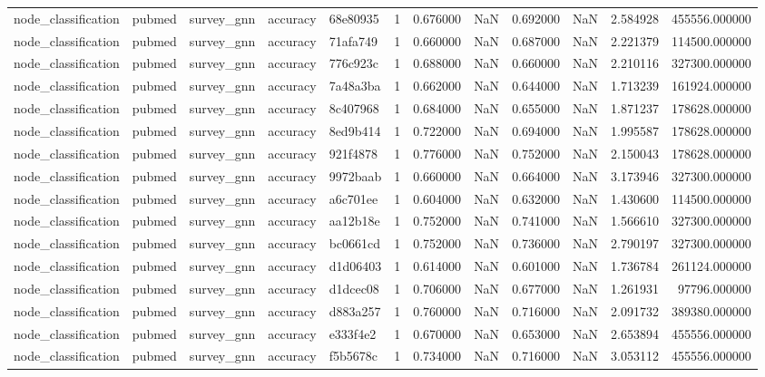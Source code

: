 \begin{tabular}{lllllrrrrrrr}
node_classification & pubmed & survey_gnn & accuracy & 68e80935 & 1 & 0.676000 & NaN & 0.692000 & NaN & 2.584928 & 455556.000000 \\
node_classification & pubmed & survey_gnn & accuracy & 71afa749 & 1 & 0.660000 & NaN & 0.687000 & NaN & 2.221379 & 114500.000000 \\
node_classification & pubmed & survey_gnn & accuracy & 776c923c & 1 & 0.688000 & NaN & 0.660000 & NaN & 2.210116 & 327300.000000 \\
node_classification & pubmed & survey_gnn & accuracy & 7a48a3ba & 1 & 0.662000 & NaN & 0.644000 & NaN & 1.713239 & 161924.000000 \\
node_classification & pubmed & survey_gnn & accuracy & 8c407968 & 1 & 0.684000 & NaN & 0.655000 & NaN & 1.871237 & 178628.000000 \\
node_classification & pubmed & survey_gnn & accuracy & 8ed9b414 & 1 & 0.722000 & NaN & 0.694000 & NaN & 1.995587 & 178628.000000 \\
node_classification & pubmed & survey_gnn & accuracy & 921f4878 & 1 & 0.776000 & NaN & 0.752000 & NaN & 2.150043 & 178628.000000 \\
node_classification & pubmed & survey_gnn & accuracy & 9972baab & 1 & 0.660000 & NaN & 0.664000 & NaN & 3.173946 & 327300.000000 \\
node_classification & pubmed & survey_gnn & accuracy & a6c701ee & 1 & 0.604000 & NaN & 0.632000 & NaN & 1.430600 & 114500.000000 \\
node_classification & pubmed & survey_gnn & accuracy & aa12b18e & 1 & 0.752000 & NaN & 0.741000 & NaN & 1.566610 & 327300.000000 \\
node_classification & pubmed & survey_gnn & accuracy & bc0661cd & 1 & 0.752000 & NaN & 0.736000 & NaN & 2.790197 & 327300.000000 \\
node_classification & pubmed & survey_gnn & accuracy & d1d06403 & 1 & 0.614000 & NaN & 0.601000 & NaN & 1.736784 & 261124.000000 \\
node_classification & pubmed & survey_gnn & accuracy & d1dcec08 & 1 & 0.706000 & NaN & 0.677000 & NaN & 1.261931 & 97796.000000 \\
node_classification & pubmed & survey_gnn & accuracy & d883a257 & 1 & 0.760000 & NaN & 0.716000 & NaN & 2.091732 & 389380.000000 \\
node_classification & pubmed & survey_gnn & accuracy & e333f4e2 & 1 & 0.670000 & NaN & 0.653000 & NaN & 2.653894 & 455556.000000 \\
node_classification & pubmed & survey_gnn & accuracy & f5b5678c & 1 & 0.734000 & NaN & 0.716000 & NaN & 3.053112 & 455556.000000 \\

\end{tabular}
